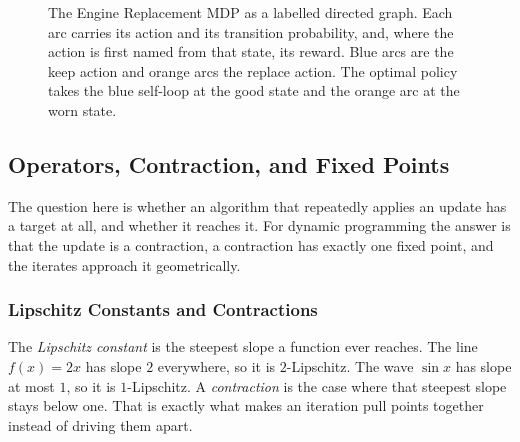 \begin{figure}[t]
\centering
{}
\caption{The Engine Replacement MDP as a labelled directed graph. Each arc carries its action and its transition probability, and, where the action is first named from that state, its reward. Blue arcs are the keep action and orange arcs the replace action. The optimal policy takes the blue self-loop at the good state and the orange arc at the worn state.}
\label{fig:prelim_mdp_graph}
\end{figure}

\FloatBarrier
\subsection{Operators, Contraction, and Fixed Points}
\label{prelim:operators}

The question here is whether an algorithm that repeatedly applies an update has a target at all, and whether it reaches it. For dynamic programming the answer is that the update is a contraction, a contraction has exactly one fixed point, and the iterates approach it geometrically.

\FloatBarrier
\subsubsection{Lipschitz Constants and Contractions}

The \emph{Lipschitz constant} is the steepest slope a function ever reaches. The line $f(x) = 2x$ has slope $2$ everywhere, so it is $2$-Lipschitz. The wave $\sin x$ has slope at most $1$, so it is $1$-Lipschitz. A \emph{contraction} is the case where that steepest slope stays below one. That is exactly what makes an iteration pull points together instead of driving them apart.

